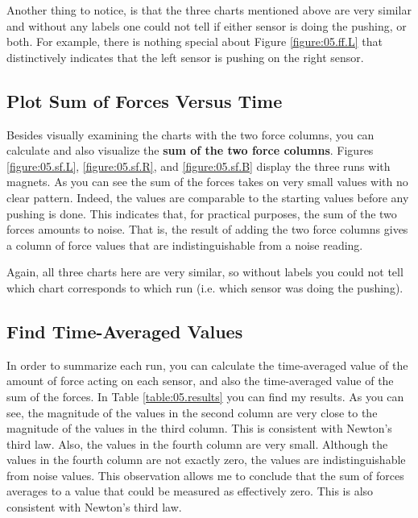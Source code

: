 Another thing to notice, is that the three charts mentioned above are very similar and without any labels one could not tell if either sensor is doing the pushing, or both. For example, there is nothing special about Figure \ref{figure:05.ff.L} that distinctively indicates that the left sensor is pushing on the right sensor.
\subsection{Plot Sum of Forces Versus Time}
Besides visually examining the charts with the two force columns, you can calculate and also visualize the \textbf{sum of the two force columns}. Figures \ref{figure:05.sf.L}, \ref{figure:05.sf.R}, and \ref{figure:05.sf.B} display the three runs with magnets. As you can see the sum of the forces takes on very small values with no clear pattern. Indeed, the values are comparable to the starting values before any pushing is done. This indicates that, for practical purposes, the sum of the two forces amounts to noise. That is, the result of adding the two force columns gives a column of force values that are indistinguishable from a noise reading.

Again, all three charts here are very similar, so without labels you could not tell which chart corresponds to which run (i.e. which sensor was doing the pushing).
\subsection{Find Time-Averaged Values}
In order to summarize each run, you can calculate the time-averaged value of the amount of force acting on each sensor, and also the time-averaged value of the sum of the forces. In Table \ref{table:05.results} you can find my results. As you can see, the magnitude of the values in the second column are very close to the magnitude of the values in the third column. This is consistent with Newton's third law. Also, the values in the fourth column are very small. Although the values in the fourth column are not exactly zero, the values are indistinguishable from noise values. This observation allows me to conclude that the sum of forces averages to a value that could be measured as effectively zero. This is also consistent with Newton's third law.

